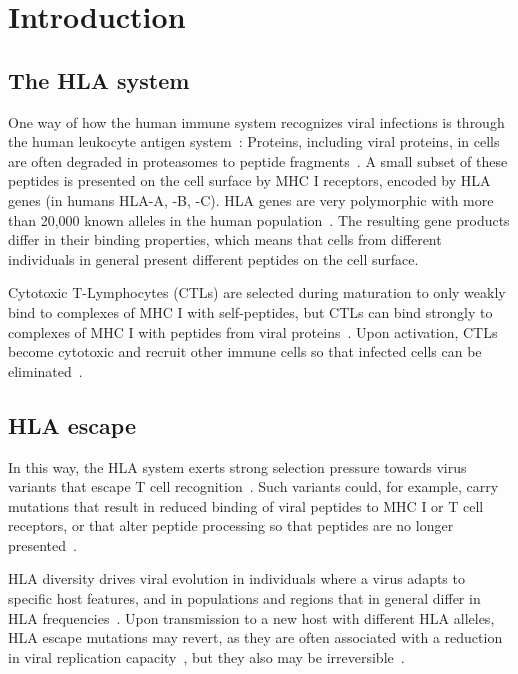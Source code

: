 \documentclass{bioinfo}
\begin{document}
\maketitle
\sloppy
\section{Introduction}
\subsection{The HLA system}

One way of how the human immune system recognizes viral infections is through the human leukocyte antigen system~\citep{Germain1994}: Proteins, including viral proteins, in cells are often degraded in proteasomes to peptide fragments~\citep{Goldberg2002}. A small subset of these peptides is presented on the cell surface by MHC I receptors, encoded by HLA genes (in humans HLA-A, -B, -C). HLA genes are very polymorphic with more than 20,000 known alleles in the human population~\citep{Robinson2014}. The resulting gene products differ in their binding properties, which means that cells from different individuals in general present different peptides on the cell surface.

Cytotoxic T-Lymphocytes (CTLs) are selected during maturation to only weakly bind to complexes of MHC I with self-peptides, but CTLs can bind strongly to complexes of MHC I with peptides from viral proteins~\citep{Murata2007}. Upon activation, CTLs become cytotoxic and recruit other immune cells so that infected cells can be eliminated~\citep{Harty2000}.

\subsection{HLA escape}
In this way, the HLA system exerts strong selection pressure towards virus variants that escape T cell recognition~\citep{Borrow1997}. Such variants could, for example, carry mutations that result in reduced binding of viral peptides to MHC I or T cell receptors, or that alter peptide processing so that peptides are no longer presented~\citep{Yewdell2002}.

HLA diversity drives viral evolution in individuals where a virus adapts to specific host features, and in populations and regions that in general differ in HLA frequencies~\citep{Kawashima2009}. Upon transmission to a new host with different HLA alleles, HLA escape mutations may revert, as they are often associated with a reduction in viral replication capacity~\citep{Matthews2008}, but they also may be irreversible~\citep{Kawashima2009}.
\end{document}
